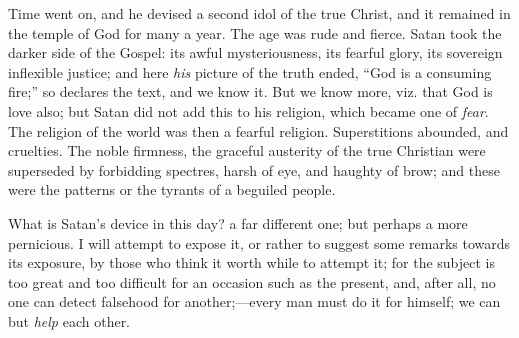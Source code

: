 Time went on, and he devised a second idol of the true
Christ, and it remained in the temple of God for many a
year. The age was rude and fierce. Satan took the darker
side of the Gospel: its awful mysteriousness, its fearful
glory, its sovereign inflexible justice; and here \emph{his}
picture of the truth ended, ``God is a consuming
fire;'' so declares the text, and we know it. But we
know more, viz. that God is love also; but Satan did not
add this to his religion, which became one of \emph{fear}.
The religion of the world was then a fearful religion.
Superstitions abounded, and cruelties. The noble
firmness, the graceful austerity of the true Christian
were superseded by forbidding spectres, harsh of eye, and
haughty of brow; and these were the patterns or the
tyrants of a beguiled people.

What is Satan's device in this day? a far different
one; but perhaps a more pernicious. I will attempt to
expose it, or rather to suggest some remarks towards its
exposure, by those who think it worth while to attempt
it; for the subject is too great and too difficult for an
occasion such as the present, and, after all, no one can
detect falsehood for another;—every man must do it
for himself; we can but \emph{help} each other.

